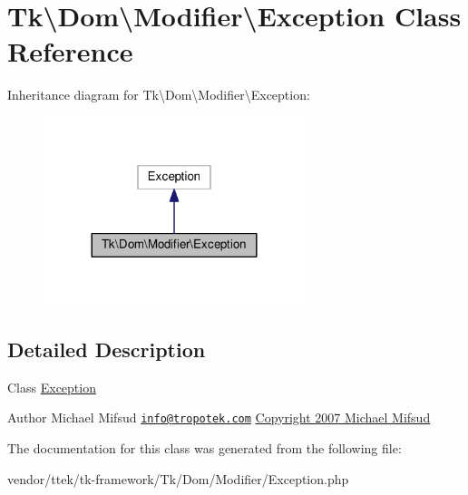 \hypertarget{classTk_1_1Dom_1_1Modifier_1_1Exception}{\section{Tk\textbackslash{}Dom\textbackslash{}Modifier\textbackslash{}Exception Class Reference}
\label{classTk_1_1Dom_1_1Modifier_1_1Exception}
}


Inheritance diagram for Tk\textbackslash{}Dom\textbackslash{}Modifier\textbackslash{}Exception\+:\nopagebreak
\begin{figure}[H]
\begin{center}
\leavevmode
\includegraphics[width=216pt]{classTk_1_1Dom_1_1Modifier_1_1Exception__inherit__graph}
\end{center}
\end{figure}


\subsection{Detailed Description}
Class \hyperlink{classTk_1_1Dom_1_1Modifier_1_1Exception}{Exception}

\begin{DoxyAuthor}{Author}
Michael Mifsud \href{mailto:info@tropotek.com}{\tt info@tropotek.\+com} \hyperlink{}{Copyright 2007 Michael Mifsud }
\end{DoxyAuthor}


The documentation for this class was generated from the following file\+:\begin{DoxyCompactItemize}
\item 
vendor/ttek/tk-\/framework/\+Tk/\+Dom/\+Modifier/Exception.\+php\end{DoxyCompactItemize}
